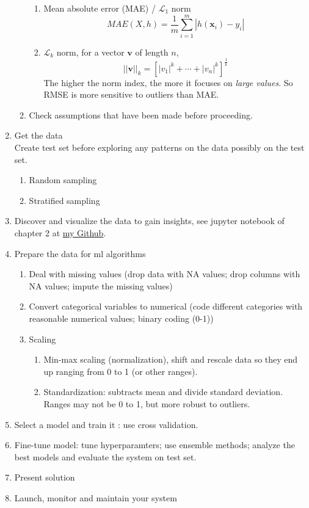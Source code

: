 \documentclass[12pt,oneside,a4paper]{article}
\numberwithin{equation}{section}
\newcommand{\bfv}{\boldsymbol{v}}
\newcommand{\bfx}{\boldsymbol{x}}
\begin{document}
\begin{enumerate}
\begin{enumerate}
\begin{enumerate}
\item Mean absolute error (MAE) / $\mathcal{L}_1$ norm
\begin{equation}
MAE(X, h) =\frac{1}{m} \sum_{i=1}^{m}|h(\bfx_{i}) - y_{i}|
\end{equation}
\item $\mathcal{L}_k$ norm, for a vector $\bfv$ of length $n$,
\begin{equation}
||\bfv||_k = \left[|v_1|^k + \cdots + |v_n|^k\right]^{\frac{1}{k}}
\end{equation}
The higher the norm index, the more it focuses on \emph{large values}. So RMSE is more sensitive to outliers than MAE.
\end{enumerate}
\item Check assumptions that have been made before proceeding. 
\end{enumerate}
\item Get the data \\
Create test set before exploring any patterns on the data possibly on the test set.
\begin{enumerate}
\item Random sampling
\item Stratified sampling
\end{enumerate}
\item Discover and visualize the data to gain insights, see jupyter notebook of chapter 2 at \href{https://github.com/QianqianShan/HandsOnMachineLearning}{my Github}. 
\item Prepare the data for ml algorithms 
\begin{enumerate}
\item Deal with missing values (drop data with NA values; drop columns with NA values; impute the missing values)
\item Convert categorical variables to numerical (code different categories with reasonable numerical values; binary coding (0-1))
\item Scaling 
\begin{enumerate}
\item Min-max scaling (normalization), shift and rescale data so they end up ranging from 0 to 1 (or other ranges). 
\item Standardization: subtracts mean and divide standard deviation. Ranges may not be 0 to 1, but more robust to outliers.
\end{enumerate}
\end{enumerate}
\item Select a model and train it : use cross validation. 
\item Fine-tune model: tune hyperparamters; use ensemble methods; analyze the best models and evaluate the system on test set.  
\item Present solution
\item Launch, monitor and maintain your system 
\end{enumerate} 
\end{document}
